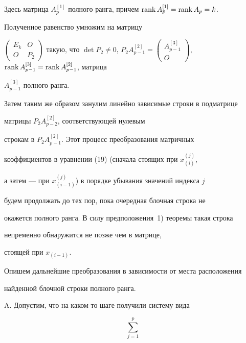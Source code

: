 \begin{pf}
Здесь матрица $A_p^{[1]}$ полного ранга, причем $\operatorname{rank} A_p^{[1]}=\operatorname{rank} A_p=k$. 


Полученное равенство умножим на матрицу


$\left(\begin{smallmatrix}


 E_k & O\\ O & P_2


\end{smallmatrix}\right)$ такую, что $\det P_2 \ne 0$, $P_2A^{[2]}_{p-1}=


\left(\begin{smallmatrix}


A_{p-1}^{[3]} \\ O


\end{smallmatrix}\right)$, $\rank A_{p-1}^{[3]}=\rank A_{p-1}^{[2]}$, матрица


$A_{p-1}^{[3]}$ полного ранга.





Затем таким же образом занулим линейно зависимые строки в подматрице


матрицы $P_2A_{p-2}^{[2]}$, соответствующей нулевым 


строкам в $P_2A_{p-1}^{[2]}$. Этот процесс преобразования матричных 


коэффициентов в уравнении (19) (сначала стоящих при $x_{(i)}^{(j)}$, 


а затем --- при $x_{(i-1)}^{(j)}$) в порядке убывания значений индекса $j$


будем продолжать до тех пор, пока очередная блочная строка не


окажется полного ранга. В силу предположения~1) теоремы такая строка


непременно обнаружится не позже чем в матрице,


стоящей при $x_{(i-1)}$.





Опишем дальнейшие преобразования в зависимости от места расположения


найденной блочной строки полного ранга.





A. Допустим, что на каком-то шаге получили систему вида


\begin{equation}


\sum_{j=1}^{p}{


}
\end{equation}
\end{pf}
